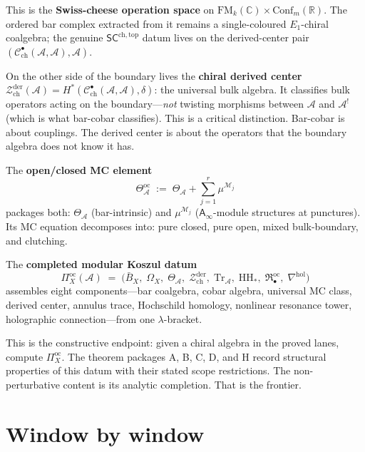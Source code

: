 \documentclass[11pt]{article}
\newcommand{\cA}{\mathcal{A}}
\newcommand{\cC}{\mathcal{C}}
\newcommand{\cM}{\mathcal{M}}
\newcommand{\cZ}{\mathcal{Z}}
\newcommand{\B}{\bar{B}}
\newcommand{\C}{\mathbb{C}}
\newcommand{\Ainf}{\mathsf{A}_{\infty}}
\newcommand{\FM}{\mathrm{FM}}
\newcommand{\SCchtop}{\mathsf{SC}^{\mathrm{ch,top}}}
\begin{document}
This is the \textbf{Swiss-cheese operation space} on
$\FM_k(\C) \times \mathrm{Conf}_m(\mathbb{R})$.
The ordered bar complex extracted from it remains a
single-coloured $E_1$-chiral coalgebra; the genuine
$\SCchtop$ datum lives on the derived-center pair
$(\cC^\bullet_{\mathrm{ch}}(\cA,\cA), \cA)$.

\medskip

On the other side of the boundary lives the \textbf{chiral
derived center}
$\cZ^{\mathrm{der}}_{\mathrm{ch}}(\cA)
= H^*(\cC^\bullet_{\mathrm{ch}}(\cA, \cA), \delta)$:
the universal bulk algebra.  It classifies bulk operators
acting on the boundary---\emph{not} twisting morphisms
between $\cA$ and $\cA^!$ (which is what bar-cobar
classifies).  This is a critical distinction.  Bar-cobar is
about couplings.  The derived center is about the operators
that the boundary algebra does not know it has.

The \textbf{open/closed MC element}
\begin{equation}\label{eq:oc-mc-wn}
\Theta^{\mathrm{oc}}_\cA \;:=\;
\Theta_\cA + \sum_{j=1}^r \mu^{\cM_j}
\end{equation}
packages both: $\Theta_\cA$ (bar-intrinsic) and $\mu^{\cM_j}$
($\Ainf$-module structures at punctures).  Its MC equation
decomposes into: pure closed, pure open, mixed bulk-boundary,
and clutching.

The \textbf{completed modular Koszul datum}
\[
\Pi^{\mathrm{oc}}_X(\cA) \;=\;
\bigl(\B_X,\; \Omega_X,\; \Theta_\cA,\;
\cZ^{\mathrm{der}}_{\mathrm{ch}},\;
\mathrm{Tr}_\cA,\;
\mathrm{HH}_*,\;
\mathfrak{R}_\bullet^{\mathrm{oc}},\;
\nabla^{\mathrm{hol}}\bigr)
\]
assembles eight components---bar coalgebra, cobar algebra,
universal MC class, derived center, annulus trace, Hochschild
homology, nonlinear resonance tower, holographic
connection---from one $\lambda$-bracket.

This is the constructive endpoint: given a chiral algebra in the
proved lanes, compute $\Pi^{\mathrm{oc}}_X$.  The theorem packages
A, B, C, D, and H record structural properties of this datum with
their stated scope restrictions.  The non-perturbative content is
its analytic completion.  That is the frontier.


\section{Window by window}
\label{sec:window}
\end{document}
